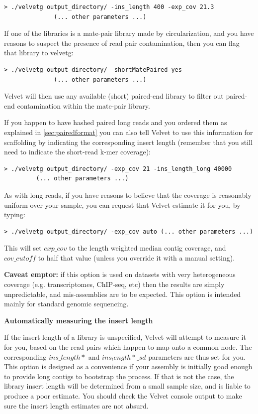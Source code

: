 \documentclass{article}
\begin{document}
\begin{verbatim}
> ./velvetg output_directory/ -ins_length 400 -exp_cov 21.3 
	          (... other parameters ...)
\end{verbatim}

If one of the libraries is a mate-pair library made by circularization, and you have reasons to suspect the presence of read pair contamination, then you can flag that library to velvetg:

\begin{verbatim}
> ./velvetg output_directory/ -shortMatePaired yes 
	          (... other parameters ...)
\end{verbatim}

Velvet will then use any available (short) paired-end library to filter out paired-end contamination within the mate-pair library.

If you happen to have hashed paired long reads and you ordered them as explained in \ref{sec:pairedformat} you can also tell Velvet to use this information for scaffolding by indicating the corresponding insert length (remember that you still need to indicate the short-read k-mer coverage):

\begin{verbatim}
> ./velvetg output_directory/ -exp_cov 21 -ins_length_long 40000 
		 (... other parameters ...)
\end{verbatim}

As with long reads, if you have reasons to believe that the coverage is reasonably uniform over your sample, you can request that Velvet estimate it for you, by typing:

\begin{verbatim}
> ./velvetg output_directory/ -exp_cov auto (... other parameters ...)
\end{verbatim}

This will set $exp\_cov$ to the length weighted median contig coverage, and $cov\_cutoff$ to half that value (unless you override it with a manual setting).

\textbf{Caveat emptor:} if this option is used on datasets with very heterogeneous coverage (e.g. transcriptomes, ChIP-seq, etc) then the results are simply unpredictable, and mis-assemblies are to be expected. This option is intended mainly for standard genomic sequencing.

\textbf{Automatically measuring the insert length} 

If the insert length of a library is unspecified, Velvet will attempt to measure it for you, based on the read-pairs which happen to map onto a common node. The corresponding $ins\_length*$ and $ins_length*\_sd$ parameters are thus set for you. This option is designed as a convenience if your assembly is initially good enough to provide long contigs to bootstrap the process. If that is not the case, the library insert length will be determined from a small sample size, and is liable to produce a poor estimate. You should check the Velvet console output to make sure the insert length estimates are not absurd.
\end{document}
